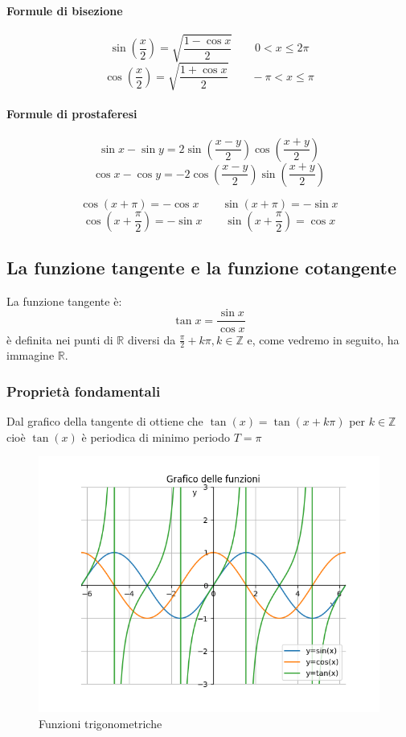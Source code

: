 \documentclass[11pt,a4paper,notitlepage]{report}
\let\numberset\mathbb
\newcommand{\Z}{\numberset{Z}}
\newcommand{\R}{\numberset{R}}
\begin{document}
\paragraph{Formule di bisezione}
\[\sin(\frac{x}{2})=\sqrt{\frac{1-\cos x}{2}} \qquad 0<x\leq 2\pi\]
\[\cos(\frac{x}{2})=\sqrt{\frac{1+\cos x}{2}} \qquad -\pi<x\leq \pi\]
\paragraph{Formule di prostaferesi}
\[\sin x -\sin y=2\sin(\frac{x-y}{2})\cos(\frac{x+y}{2})\]
\[\cos x -\cos y=-2\cos(\frac{x-y}{2})\sin(\frac{x+y}{2})\]


\[\cos(x+\pi)=-\cos x \qquad \sin(x+\pi)=-\sin x\]
\[\cos(x+\frac{\pi}{2})=-\sin x \qquad \sin(x+\frac{\pi}{2})=\cos x \]

\subsection{La funzione tangente e la funzione cotangente}
La funzione tangente è:
\[\tan x = \frac{\sin x}{\cos x}\]
è definita nei punti di $\R$ diversi da $\frac{\pi}{2} +k\pi,k\in\Z$ e, come vedremo in seguito, ha immagine $\R$.

\subsubsection{Proprietà fondamentali}
Dal grafico della tangente di ottiene che $\tan(x)=\tan(x+k\pi)$ per $k\in \Z$ cioè $\tan(x)$ è periodica di minimo periodo $T=\pi$
\begin{figure}[H]
  \centering
    \includegraphics[width=1\textwidth]{images/trigonometriche.png}
  \caption{Funzioni trigonometriche}
\end{figure}
\end{document}
